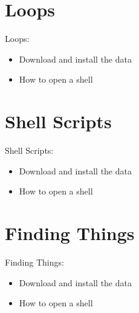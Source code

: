 \documentclass[
 size=12pt,
 paper=screen,
 mode=present,
 display=slidesnotes,
 style=paintings,
 nohandoutpagebreaks,
]{powerdot}
\begin{document}
\section[slide=false]{Loops}

\begin{slide}{Loops:}
  \begin{itemize}
     \item Download and install the data
     \item How to open a shell
  \end{itemize}
\end{slide}

\section[slide=false]{Shell Scripts}

\begin{slide}{Shell Scripts:}
  \begin{itemize}
     \item Download and install the data
     \item How to open a shell
  \end{itemize}
\end{slide}

\section[slide=false]{Finding Things}

\begin{slide}{Finding Things:}
  \begin{itemize}
     \item Download and install the data
     \item How to open a shell
  \end{itemize}
\end{slide}
\end{document}

